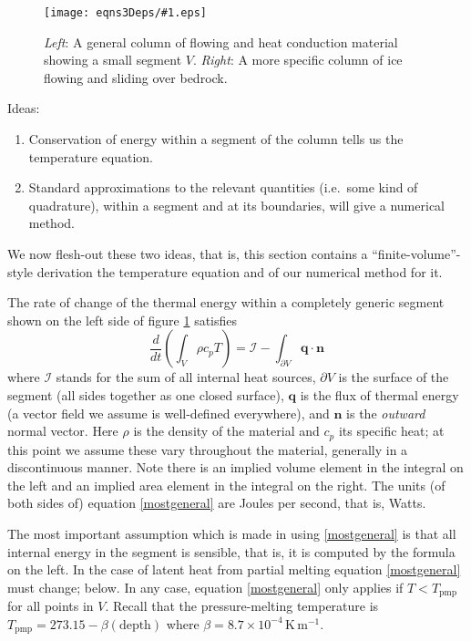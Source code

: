 \documentclass[12pt,final]{amsart}%
\theoremstyle{plain}
\theoremstyle{definition}
\theoremstyle{remark}
\newcommand{\regfigure}[2]{\texttt{[image: eqns3Deps/\#1.eps]}}
\newcommand{\DDt}[1]{\ensuremath{\frac{d #1}{d t}}}
\newcommand{\nhat}{\mathbf{n}}
\newcommand{\Tpmp}{T_{\text{pmp}}}
\newcommand{\bq}{{\mathbf{q}}}
\begin{document}
\begin{figure}[ht]
\vspace{0.2in}
\hspace{1.0in}\regfigure{earlycols}{2.6}
\vspace{0.2in}
\caption{\emph{Left}: A general column of flowing and heat conduction material showing a small segment $V$.  \emph{Right}: A more specific column of ice flowing and sliding over bedrock.}
\label{fig:earlycols}
\end{figure}

Ideas: \begin{enumerate}
\item Conservation of energy within a segment of the column  tells us the temperature equation.
\item Standard approximations to the relevant quantities (i.e.~some kind of quadrature), within a segment and at its boundaries, will give a numerical method.\end{enumerate}
We now flesh-out these two ideas, that is, this section contains a ``finite-volume''-style derivation the temperature equation and of our numerical method for it.

The rate of change of the thermal energy within a completely generic segment shown on the left side of figure \ref{fig:earlycols} satisfies
\begin{equation}\label{mostgeneral}
\DDt{}\left(\int_V \rho c_p T\right) = \mathcal{I} - \int_{\partial V} \bq \cdot \nhat
\end{equation}
where $\mathcal{I}$ stands for the sum of all internal heat sources, $\partial V$ is the surface of the segment (all sides together as one closed surface), $\bq$ is the flux of thermal energy (a vector field we assume is well-defined everywhere), and $\nhat$ is the \emph{outward} normal vector.  Here $\rho$ is the density of the material and $c_p$ its specific heat; at this point we assume these vary throughout the material, generally in a discontinuous manner.  Note there is an implied volume element in the integral on the left and an implied area element in the integral on the right.  The units (of both sides of) equation \eqref{mostgeneral} are Joules per second, that is, Watts.

The most important assumption which is made in using \eqref{mostgeneral} is that all internal energy in the segment is sensible, that is, it is computed by the formula on the left.  In the case of latent heat from partial melting equation \eqref{mostgeneral} must change; below.  In any case, equation \eqref{mostgeneral} only applies if $T < \Tpmp$ for all points in $V$.  Recall that the pressure-melting temperature is $\Tpmp = 273.15 - \beta (\text{depth})$ where $\beta = 8.7 \times 10^{-4}\,\text{K}\,\text{m}^{-1}$.
\end{document}
